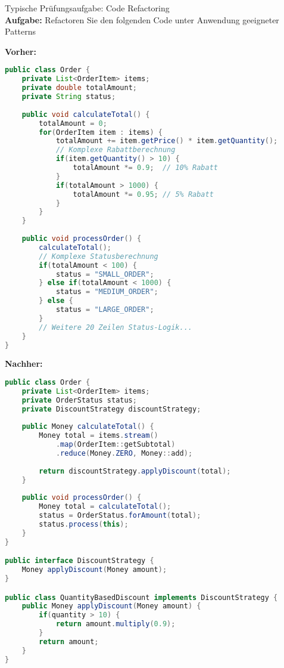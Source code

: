 \begin{example2}[breakable]{Typische Prüfungsaufgabe: Code Refactoring}\\
\textbf{Aufgabe:} Refactoren Sie den folgenden Code unter Anwendung geeigneter Patterns

\textbf{Vorher:}
\begin{lstlisting}[language=Java, style=base]
public class Order {
    private List<OrderItem> items;
    private double totalAmount;
    private String status;
    
    public void calculateTotal() {
        totalAmount = 0;
        for(OrderItem item : items) {
            totalAmount += item.getPrice() * item.getQuantity();
            // Komplexe Rabattberechnung
            if(item.getQuantity() > 10) {
                totalAmount *= 0.9;  // 10% Rabatt
            }
            if(totalAmount > 1000) {
                totalAmount *= 0.95; // 5% Rabatt
            }
        }
    }
    
    public void processOrder() {
        calculateTotal();
        // Komplexe Statusberechnung
        if(totalAmount < 100) {
            status = "SMALL_ORDER";
        } else if(totalAmount < 1000) {
            status = "MEDIUM_ORDER";
        } else {
            status = "LARGE_ORDER";
        }
        // Weitere 20 Zeilen Status-Logik...
    }
}
\end{lstlisting}

\textbf{Nachher:}
\begin{lstlisting}[language=Java, style=base]
public class Order {
    private List<OrderItem> items;
    private OrderStatus status;
    private DiscountStrategy discountStrategy;
    
    public Money calculateTotal() {
        Money total = items.stream()
            .map(OrderItem::getSubtotal)
            .reduce(Money.ZERO, Money::add);
            
        return discountStrategy.applyDiscount(total);
    }
    
    public void processOrder() {
        Money total = calculateTotal();
        status = OrderStatus.forAmount(total);
        status.process(this);
    }
}

public interface DiscountStrategy {
    Money applyDiscount(Money amount);
}

public class QuantityBasedDiscount implements DiscountStrategy {
    public Money applyDiscount(Money amount) {
        if(quantity > 10) {
            return amount.multiply(0.9);
        }
        return amount;
    }
}


\end{lstlisting}
\end{example2}
